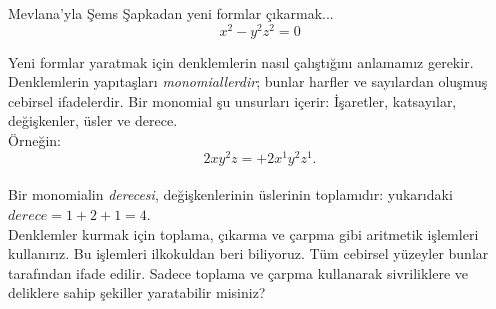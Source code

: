 \begin{surferPage}{Mevlana'yla Şems}
Şapkadan yeni formlar çıkarmak... \\
\smallskip
\[x^2	- y^2z^2	= 0\]

\singlespacing
Yeni formlar yaratmak için denklemlerin nasıl çalıştığını anlamamız gerekir. Denklemlerin yapıtaşları {\it monomiallerdir}; bunlar harfler ve sayılardan oluşmuş cebirsel ifadelerdir.
\singlespacing
Bir monomial şu unsurları içerir:
İşaretler, katsayılar, değişkenler, üsler ve derece.\\
\singlespacing
Örneğin: 
\smallskip
\[2xy^2z = +2x^1y^2z^1.\]
\\
\smallskip
Bir monomialin  {\it derecesi}, değişkenlerinin üslerinin toplamıdır: yukarıdaki $derece = 1+2+1=4$.  \\
\singlespacing
Denklemler kurmak için toplama, çıkarma ve çarpma gibi aritmetik işlemleri kullanırız. Bu işlemleri ilkokuldan beri biliyoruz. Tüm cebirsel yüzeyler bunlar tarafından ifade edilir.
\singlespacing
Sadece toplama ve çarpma kullanarak sivriliklere ve deliklere sahip şekiller  yaratabilir misiniz?
\end{surferPage}
